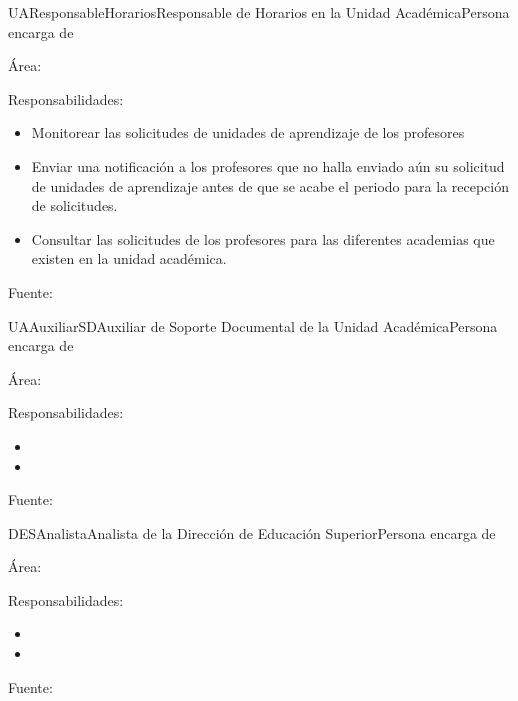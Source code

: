 \begin{actor}{UAResponsableHorarios}{Responsable de Horarios en la Unidad Académica}{Persona encarga de}
	
	\item[Área:] 
	\item[Responsabilidades:] \cdtEmpty
	\begin{itemize}
		\item Monitorear las solicitudes de unidades de aprendizaje de los profesores
		\item Enviar una notificación a los profesores que no halla enviado aún su solicitud de unidades de aprendizaje antes de que se acabe el periodo para la recepción de solicitudes.
		\item Consultar las solicitudes de los profesores para las diferentes academias que existen en la unidad académica.
	\end{itemize}

	\item[Fuente:]%
	
\end{actor}

\begin{actor}{UAAuxiliarSD}{Auxiliar de Soporte Documental de la Unidad Académica}{Persona encarga de}
	
	\item[Área:] 
	\item[Responsabilidades:] \cdtEmpty
	\begin{itemize}
		\item 
		\item 
	\end{itemize}
	
	\item[Fuente:] 
	
	
\end{actor}

\begin{actor}{DESAnalista}{Analista de la Dirección de Educación Superior}{Persona encarga de}
	
	\item[Área:] 
	\item[Responsabilidades:] \cdtEmpty
	\begin{itemize}
		\item 
		\item 
	\end{itemize}
	
	\item[Fuente:] 
	
	
\end{actor}

